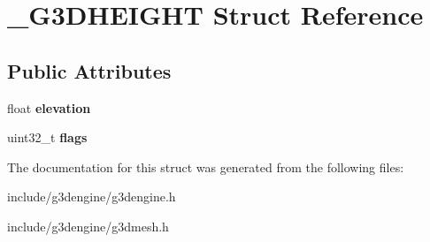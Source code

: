 \hypertarget{struct__G3DHEIGHT}{}\section{\+\_\+\+G3\+D\+H\+E\+I\+G\+HT Struct Reference}
\label{struct__G3DHEIGHT}
\subsection*{Public Attributes}
\begin{DoxyCompactItemize}
\item 
\mbox{\label{struct__G3DHEIGHT_ab980917faf347bbfe94996e4eeb10338}} 
float {\bfseries elevation}
\item 
\mbox{\label{struct__G3DHEIGHT_ab36a322966359aefcd8428665d9514a7}} 
uint32\+\_\+t {\bfseries flags}
\end{DoxyCompactItemize}


The documentation for this struct was generated from the following files\+:\begin{DoxyCompactItemize}
\item 
include/g3dengine/g3dengine.\+h\item 
include/g3dengine/g3dmesh.\+h\end{DoxyCompactItemize}
